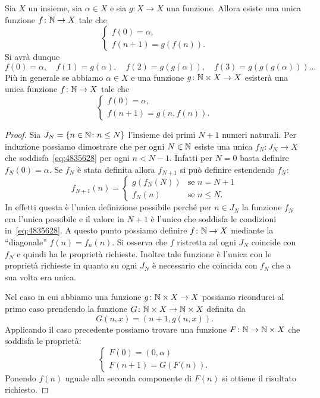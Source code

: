\begin{theorem}
\label{th:induzione}%
Sia $X$ un insieme, sia $\alpha\in X$ e sia $g\colon X\to X$ una funzione.
Allora esiste una unica funzione $f\colon \mathbb N \to X$ tale che
\begin{equation}\label{eq:4835628}
  \begin{cases}
    f(0) = \alpha, \\
    f(n+1) = g(f(n)).
  \end{cases}
\end{equation}
Si avrà dunque
\[
  f(0) = \alpha,\quad
  f(1) = g(\alpha),\quad
  f(2) = g(g(\alpha)),\quad
  f(3) = g(g(g(\alpha)))\dots
\]
Più in generale se abbiamo $\alpha\in X$ e una funzione $g\colon \mathbb N \times X \to X$
esisterà una unica funzione $f\colon \mathbb N \to X$ tale che
%
\begin{equation}
  \begin{cases}
    f(0) = \alpha, \\
    f(n+1) = g(n, f(n)).
  \end{cases}
\end{equation}
\end{theorem}
%
\begin{proof}
Sia $J_N={\left\{ n\in \mathbb N \colon n\le N \right\}}$ l'insieme dei primi $N+1$ numeri naturali.
Per induzione possiamo dimostrare che per ogni $N\in \mathbb N$ esiste una unica
$f_N\colon J_N\to X$ che soddisfa~\eqref{eq:4835628} per ogni $n<N-1$.
Infatti per $N=0$ basta definire $f_N(0) = \alpha$. 
Se $f_N$ è stata definita allora $f_{N+1}$ si può definire 
estendendo $f_N$:
\[
f_{N+1}(n) = 
\begin{cases}
  g(f_N(N)) & \text{se $n=N+1$}\\
  f_N(n) & \text{se $n\le N$}.  
\end{cases}
\]
In effetti questa è l'unica definizione possibile perché per $n\in J_N$ 
la funzione 
$f_N$ era l'unica possibile e il valore in $N+1$ è l'unico 
che soddisfa le condizioni in~\eqref{eq:4835628}.
A questo punto possiamo definire $f\colon \mathbb N\to X$ 
mediante la ``diagonale'' $f(n) = f_n(n)$.
Si osserva che $f$ ristretta ad ogni $J_N$ coincide con $f_N$
e quindi ha le proprietà richieste. Inoltre tale funzione è l'unica con le 
proprietà richieste in quanto su ogni $J_N$ è necessario che coincida con $f_N$
che a sua volta era unica.

Nel caso in cui abbiamo una funzione $g\colon \mathbb N\times X \to X$
possiamo ricondurci al primo caso prendendo la funzione 
$G\colon \mathbb N\times X \to \mathbb N\times X$ definita da 
\[
  G(n,x) = (n+1,g(n,x)).
\]
Applicando il caso precedente possiamo trovare una funzione $F\colon \mathbb N\to \mathbb N\times X$
che soddisfa le proprietà:
\[
 \begin{cases}
  F(0) = (0,\alpha)\\
  F(n+1) = G(F(n)).  
 \end{cases}
\]
Ponendo $f(n)$ uguale alla seconda componente di $F(n)$ si ottiene il risultato richiesto.
\end{proof}

